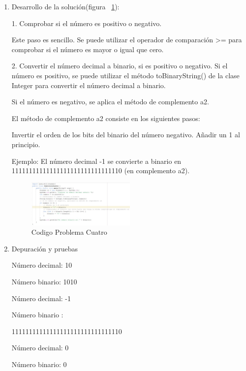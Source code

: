 \documentclass{IEEEcsmag}
\begin{document}
\begin{enumerate}
\item  Desarrollo de la solución(figura ~\ref{fig:codigoP4}):

1. Comprobar si el número es positivo o negativo.

Este paso es sencillo. Se puede utilizar el operador de comparación >= para comprobar si el número es mayor o igual que cero.

2. Convertir el número decimal a binario, si es positivo o negativo.
Si el número es positivo, se puede utilizar el método toBinaryString() de la clase Integer para convertir el número decimal a binario.

Si el número es negativo, se aplica el método de complemento a2.

El método de complemento a2 consiste en los siguientes pasos:
 
 Invertir el orden de los bits del binario del número negativo.
 Añadir un 1 al principio.\newline
 
Ejemplo:
El número decimal -1 se convierte a binario en 11111111111111111111111111111110 (en complemento a2).\newline


\begin{figure}
\caption{Codigo Problema Cuatro}
\centerline{\includegraphics[width=0.5\textwidth]{./latex-imagenes/codigoprob4.jpg}}
\vspace*{7pt}
\label{fig:codigoP4}
\end{figure}
 



\item  Depuración y pruebas

Número decimal: 10

Número binario: 1010

Número decimal: -1

Número binario : 

11111111111111111111111111111110

Número decimal: 0

Número binario: 0

    
\end{enumerate}
\vspace*{5pt}
\end{document}
